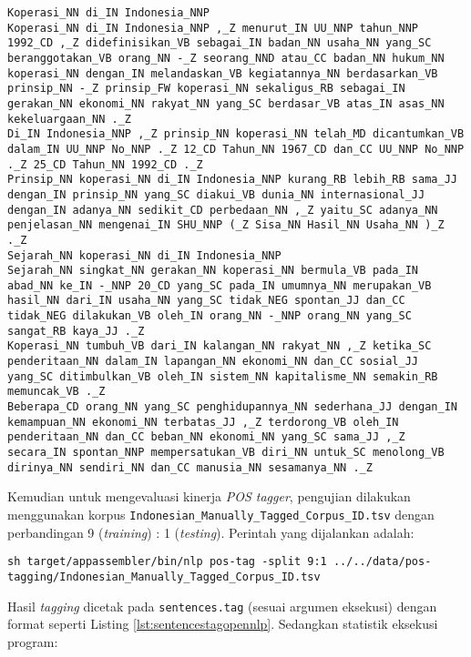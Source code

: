 \documentclass[paper=a4, fontsize=11pt]{scrartcl} %
\numberwithin{equation}{section} %
\numberwithin{figure}{section} %
\numberwithin{table}{section} %
\begin{document}
\begin{lstlisting}[caption={Wikipedia.opennlp.tagged},label={lst:wikipediaopennlptagged}]
Koperasi_NN di_IN Indonesia_NNP
Koperasi_NN di_IN Indonesia_NNP ,_Z menurut_IN UU_NNP tahun_NNP 1992_CD ,_Z didefinisikan_VB sebagai_IN badan_NN usaha_NN yang_SC beranggotakan_VB orang_NN -_Z seorang_NND atau_CC badan_NN hukum_NN koperasi_NN dengan_IN melandaskan_VB kegiatannya_NN berdasarkan_VB prinsip_NN -_Z prinsip_FW koperasi_NN sekaligus_RB sebagai_IN gerakan_NN ekonomi_NN rakyat_NN yang_SC berdasar_VB atas_IN asas_NN kekeluargaan_NN ._Z
Di_IN Indonesia_NNP ,_Z prinsip_NN koperasi_NN telah_MD dicantumkan_VB dalam_IN UU_NNP No_NNP ._Z 12_CD Tahun_NN 1967_CD dan_CC UU_NNP No_NNP ._Z 25_CD Tahun_NN 1992_CD ._Z
Prinsip_NN koperasi_NN di_IN Indonesia_NNP kurang_RB lebih_RB sama_JJ dengan_IN prinsip_NN yang_SC diakui_VB dunia_NN internasional_JJ dengan_IN adanya_NN sedikit_CD perbedaan_NN ,_Z yaitu_SC adanya_NN penjelasan_NN mengenai_IN SHU_NNP (_Z Sisa_NN Hasil_NN Usaha_NN )_Z ._Z
Sejarah_NN koperasi_NN di_IN Indonesia_NNP
Sejarah_NN singkat_NN gerakan_NN koperasi_NN bermula_VB pada_IN abad_NN ke_IN -_NNP 20_CD yang_SC pada_IN umumnya_NN merupakan_VB hasil_NN dari_IN usaha_NN yang_SC tidak_NEG spontan_JJ dan_CC tidak_NEG dilakukan_VB oleh_IN orang_NN -_NNP orang_NN yang_SC sangat_RB kaya_JJ ._Z
Koperasi_NN tumbuh_VB dari_IN kalangan_NN rakyat_NN ,_Z ketika_SC penderitaan_NN dalam_IN lapangan_NN ekonomi_NN dan_CC sosial_JJ yang_SC ditimbulkan_VB oleh_IN sistem_NN kapitalisme_NN semakin_RB memuncak_VB ._Z
Beberapa_CD orang_NN yang_SC penghidupannya_NN sederhana_JJ dengan_IN kemampuan_NN ekonomi_NN terbatas_JJ ,_Z terdorong_VB oleh_IN penderitaan_NN dan_CC beban_NN ekonomi_NN yang_SC sama_JJ ,_Z secara_IN spontan_NNP mempersatukan_VB diri_NN untuk_SC menolong_VB dirinya_NN sendiri_NN dan_CC manusia_NN sesamanya_NN ._Z
\end{lstlisting}

Kemudian untuk mengevaluasi kinerja \textit{POS tagger}, pengujian dilakukan menggunakan korpus \verb|Indonesian_Manually_Tagged_Corpus_ID.tsv| dengan perbandingan 9 (\textit{training}) : 1 (\textit{testing}). Perintah yang dijalankan adalah:

\begin{lstlisting}
sh target/appassembler/bin/nlp pos-tag -split 9:1 ../../data/pos-tagging/Indonesian_Manually_Tagged_Corpus_ID.tsv
\end{lstlisting}

Hasil \textit{tagging} dicetak pada \verb|sentences.tag| (sesuai argumen eksekusi) dengan format seperti Listing \ref{lst:sentencestagopennlp}. Sedangkan statistik eksekusi program:
\end{document}
